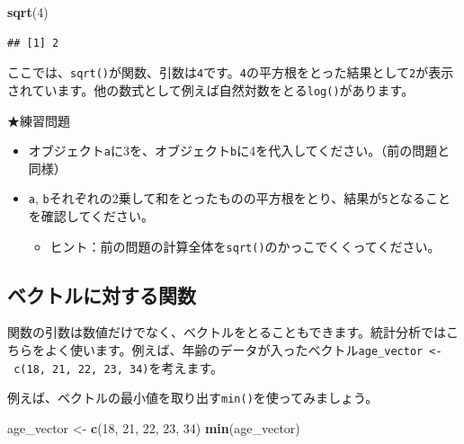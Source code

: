 \documentclass[]{book}
\newenvironment{Shaded}{\begin{snugshade}}{\end{snugshade}}
\newcommand{\KeywordTok}[1]{\textcolor[rgb]{0.13,0.29,0.53}{\textbf{#1}}}
\newcommand{\DecValTok}[1]{\textcolor[rgb]{0.00,0.00,0.81}{#1}}
\newcommand{\StringTok}[1]{\textcolor[rgb]{0.31,0.60,0.02}{#1}}
\newcommand{\NormalTok}[1]{#1}
\providecommand{\tightlist}{%
  \setlength{\itemsep}{0pt}\setlength{\parskip}{0pt}}
\begin{document}
\begin{Shaded}
\begin{Highlighting}[]
\KeywordTok{sqrt}\NormalTok{(}\DecValTok{4}\NormalTok{)}
\end{Highlighting}
\end{Shaded}

\begin{verbatim}
## [1] 2
\end{verbatim}

ここでは、\texttt{sqrt()}が関数、引数は\texttt{4}です。\texttt{4}の平方根をとった結果として\texttt{2}が表示されています。他の数式として例えば自然対数をとる\texttt{log()}があります。

★練習問題

\begin{itemize}
\tightlist
\item
  オブジェクト\texttt{a}に3を、オブジェクト\texttt{b}に4を代入してください。（前の問題と同様）
\item
  \texttt{a},
  \texttt{b}それぞれの2乗して和をとったものの平方根をとり、結果が\texttt{5}となることを確認してください。

  \begin{itemize}
  \tightlist
  \item
    ヒント：前の問題の計算全体を\texttt{sqrt()}のかっこでくくってください。
  \end{itemize}
\end{itemize}

\subsection{ベクトルに対する関数}\label{ux30d9ux30afux30c8ux30ebux306bux5bfeux3059ux308bux95a2ux6570}

関数の引数は数値だけでなく、ベクトルをとることもできます。統計分析ではこちらをよく使います。例えば、年齢のデータが入ったベクトル\texttt{age\_vector\ \textless{}-\ c(18,\ 21,\ 22,\ 23,\ 34)}を考えます。

例えば、ベクトルの最小値を取り出す\texttt{min()}を使ってみましょう。

\begin{Shaded}
\begin{Highlighting}[]
\NormalTok{age_vector <-}\StringTok{ }\KeywordTok{c}\NormalTok{(}\DecValTok{18}\NormalTok{, }\DecValTok{21}\NormalTok{, }\DecValTok{22}\NormalTok{, }\DecValTok{23}\NormalTok{, }\DecValTok{34}\NormalTok{)}
\KeywordTok{min}\NormalTok{(age_vector)}
\end{Highlighting}
\end{Shaded}
\end{document}

